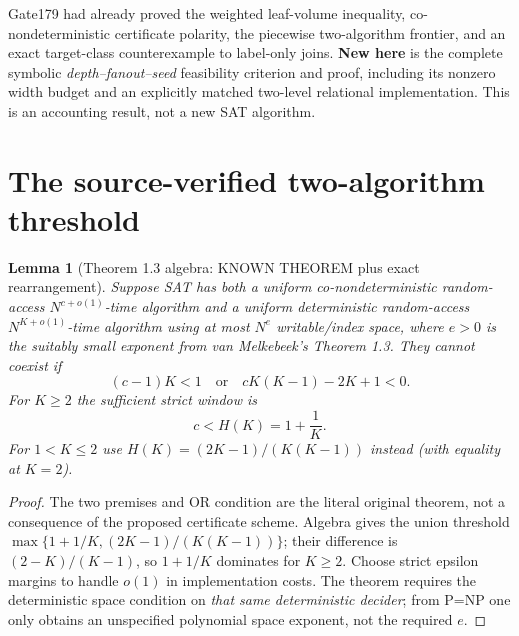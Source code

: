 \documentclass[11pt]{article}
\newtheorem{lemma}[theorem]{Lemma}
\begin{document}
Gate179 had already proved the weighted leaf-volume inequality,
co-nondeterministic certificate polarity, the piecewise two-algorithm
frontier, and an exact target-class counterexample to label-only joins.
\textbf{New here} is the complete symbolic \emph{depth--fanout--seed}
feasibility criterion and proof, including its nonzero width budget and
an explicitly matched two-level relational implementation.
This is an accounting result, not a new SAT algorithm.

\section{The source-verified two-algorithm threshold}
\begin{lemma}[Theorem 1.3 algebra: KNOWN THEOREM plus exact rearrangement]
Suppose SAT has both a uniform co-nondeterministic random-access
$N^{c+o(1)}$-time algorithm and a uniform deterministic random-access
$N^{K+o(1)}$-time algorithm using at most $N^{e}$ writable/index space,
where $e>0$ is the suitably small exponent from van Melkebeek's
Theorem 1.3. They cannot coexist if
\[
(c-1)K<1\quad\text{or}\quad cK(K-1)-2K+1<0.
\]
For $K\ge2$ the sufficient strict window is
\[
\boxed{c< H(K)=1+\frac1K.}
\]
For $1<K\le2$ use
$H(K)=(2K-1)/(K(K-1))$ instead (with equality at $K=2$).
\end{lemma}
\begin{proof}
The two premises and OR condition are the literal original theorem,
not a consequence of the proposed certificate scheme. Algebra gives the
union threshold
$\max\{1+1/K,(2K-1)/(K(K-1))\}$; their difference is
$(2-K)/(K-1)$, so $1+1/K$ dominates for $K\ge2$.
Choose strict epsilon margins to handle $o(1)$ in implementation costs.
The theorem requires the deterministic space condition on \emph{that
same deterministic decider}; from P=NP one only obtains an unspecified
polynomial space exponent, not the required $e$.
\end{proof}
\end{document}
